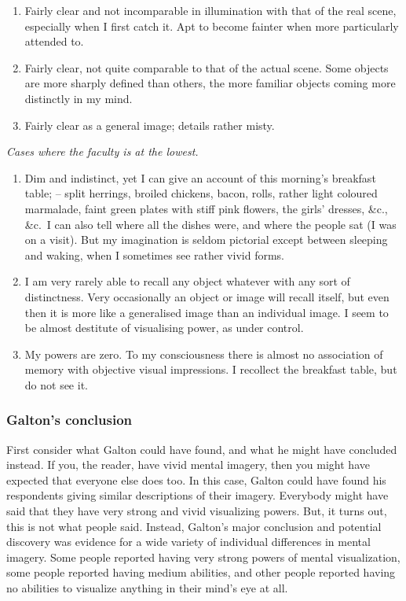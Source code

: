 \documentclass[
  oneside,
  12pt]{crumpbook}
\begin{document}
\begin{enumerate}
\def\labelenumi{\arabic{enumi}.}
\setcounter{enumi}{45}
\item
  Fairly clear and not incomparable in illumination with that of the real scene, especially when I first catch it. Apt to become fainter when more particularly attended to.
\item
  Fairly clear, not quite comparable to that of the actual scene. Some objects are more sharply defined than others, the more familiar objects coming more distinctly in my mind.
\item
  Fairly clear as a general image; details rather misty.
\end{enumerate}

\emph{Cases where the faculty is at the lowest.}

\begin{enumerate}
\def\labelenumi{\arabic{enumi}.}
\setcounter{enumi}{88}
\item
  Dim and indistinct, yet I can give an account of this morning's breakfast table; -- split herrings, broiled chickens, bacon, rolls, rather light coloured marmalade, faint green plates with stiff pink flowers, the girls' dresses, \&c., \&c.~I can also tell where all the dishes were, and where the people sat (I was on a visit). But my imagination is seldom pictorial except between sleeping and waking, when I sometimes see rather vivid forms.
\item
  I am very rarely able to recall any object whatever with any sort of distinctness. Very occasionally an object or image will recall itself, but even then it is more like a generalised image than an individual image. I seem to be almost destitute of visualising power, as under control.
\item
  My powers are zero. To my consciousness there is almost no association of memory with objective visual impressions. I recollect the breakfast table, but do not see it.
\end{enumerate}

\hypertarget{galtons-conclusion}{%
\subsubsection{Galton's conclusion}\label{galtons-conclusion}}

First consider what Galton could have found, and what he might have concluded instead. If you, the reader, have vivid mental imagery, then you might have expected that everyone else does too. In this case, Galton could have found his respondents giving similar descriptions of their imagery. Everybody might have said that they have very strong and vivid visualizing powers. But, it turns out, this is not what people said. Instead, Galton's major conclusion and potential discovery was evidence for a wide variety of individual differences in mental imagery. Some people reported having very strong powers of mental visualization, some people reported having medium abilities, and other people reported having no abilities to visualize anything in their mind's eye at all.
\end{document}
